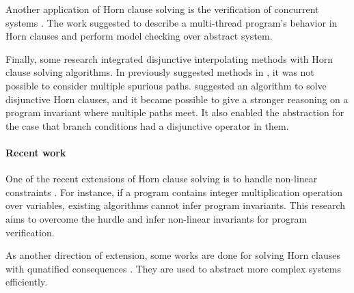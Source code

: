 Another application of Horn clause solving is the verification of
concurrent systems \cite{conf/popl/GuptaPR11}. The work suggested to
describe a multi-thread program's behavior in Horn clauses and perform
model checking over abstract system.

Finally, some research integrated disjunctive interpolating methods
with Horn clause solving algorithms.  In previously suggested methods
in \cite{conf/popl/HenzingerJMM04, conf/cav/McMillan06}, it was not
possible to consider multiple spurious
paths.  \cite{conf/cav/RummerHK13} suggested an algorithm to solve
disjunctive Horn clauses, and it became possible to give a stronger
reasoning on a program invariant where multiple paths meet.  It also
enabled the abstraction for the case that branch conditions had a
disjunctive operator in them.

\paragraph{Recent work}

One of the recent extensions of Horn clause solving is to handle
non-linear constraints \cite{conf/cav/DaiXZ13}.  For instance, if a
program contains integer multiplication operation over variables,
existing algorithms cannot infer program invariants.  This research
aims to overcome the hurdle and infer non-linear invariants for
program verification.

As another direction of extension, some works are done for solving
Horn clauses with qunatified consequences \cite{conf/sas/BjornerMR13,
conf/cav/BeyenePR13}.  They are used to abstract more complex systems
efficiently.
